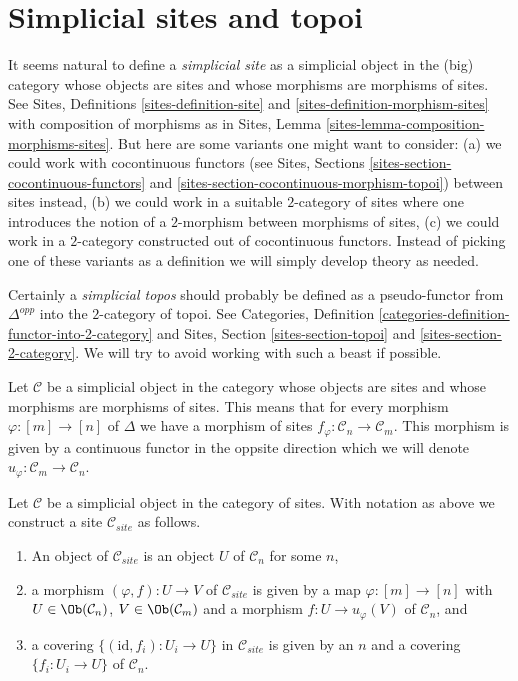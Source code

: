 \section{Simplicial sites and topoi}
\label{section-simplicial-sites}

\noindent
It seems natural to define a {\it simplicial site} as a simplicial
object in the (big) category whose objects are sites
and whose morphisms are morphisms of sites.
See Sites, Definitions \ref{sites-definition-site} and
\ref{sites-definition-morphism-sites}
with composition of morphisms as in 
Sites, Lemma \ref{sites-lemma-composition-morphisms-sites}.
But here are some variants one might want to consider:
(a) we could work with cocontinuous functors
(see Sites, Sections \ref{sites-section-cocontinuous-functors} and
\ref{sites-section-cocontinuous-morphism-topoi}) between sites instead,
(b) we could work in a suitable $2$-category of sites where one introduces
the notion of a $2$-morphism between morphisms of sites,
(c) we could work in a $2$-category constructed out of cocontinuous
functors. Instead of picking one of these variants as a definition
we will simply develop theory as needed.

\medskip\noindent
Certainly a {\it simplicial topos} should probably be defined as a
pseudo-functor from $\Delta^{opp}$ into the $2$-category of topoi.
See Categories, Definition \ref{categories-definition-functor-into-2-category}
and Sites, Section \ref{sites-section-topoi} and
\ref{sites-section-2-category}. We will try to avoid working with such
a beast if possible.

\medskip\noindent
Let $\mathcal{C}$ be a simplicial object in the category whose objects
are sites and whose morphisms are morphisms of sites. This means that
for every morphism $\varphi : [m] \to [n]$ of $\Delta$ we have a morphism
of sites $f_\varphi : \mathcal{C}_n \to \mathcal{C}_m$. This morphism is
given by a continuous functor in the oppsite direction which we will denote
$u_\varphi : \mathcal{C}_m \to \mathcal{C}_n$.

\begin{lemma}
\label{lemma-simplicial-site-site}
Let $\mathcal{C}$ be a simplicial object in the category of sites.
With notation as above we construct a site $\mathcal{C}_{site}$ as follows.
\begin{enumerate}
\item An object of $\mathcal{C}_{site}$ is an object $U$ of
$\mathcal{C}_n$ for some $n$,
\item a morphism $(\varphi, f) : U \to V$ of $\mathcal{C}_{site}$
is given by a map $\varphi : [m] \to [n]$ with
$U \in \Ob(\mathcal{C}_n)$, $V \in \Ob(\mathcal{C}_m)$
and a morphism $f : U \to u_\varphi(V)$ of $\mathcal{C}_n$, and
\item a covering $\{(\text{id}, f_i) :  U_i \to U\}$ in $\mathcal{C}_{site}$
is given by an $n$ and a covering $\{f_i : U_i \to U\}$
of $\mathcal{C}_n$.
\end{enumerate}
\end{lemma}


